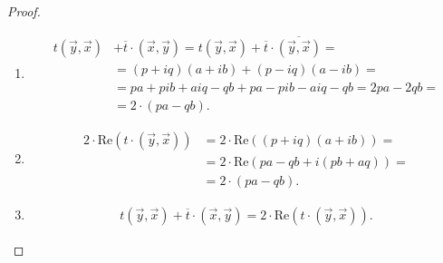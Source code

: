 \begin{proof}
    \begin{enumerate}
        \item \begin{align*}
            t(\vec{y}, \vec{x}) &+ \overline{t} \cdot (\vec{x}, \vec{y}) = t(\vec{y}, \vec{x}) + \overline{t} \cdot \overline{(\vec{y}, \vec{x})} = \\
            &= (p + iq)(a + ib) + (p - iq)(a - ib) = \\ 
            &= pa + pib + aiq - qb + pa - pib - aiq - qb = 2pa - 2qb = \\
            &= 2 \cdot (pa - qb).
        \end{align*}
        \item \begin{align*}
            2 \cdot \text{Re} (t \cdot (\vec{y}, \vec{x})) &= 2 \cdot \text{Re}((p + iq)(a + ib)) = \\
            &= 2 \cdot \text{Re}(pa - qb + i(pb + aq)) = \\
            &= 2 \cdot (pa - qb).
        \end{align*}
        \item \begin{align*}
            t(\vec{y}, \vec{x}) + \overline{t} \cdot (\vec{x}, \vec{y}) = 2 \cdot \text{Re} (t \cdot (\vec{y}, \vec{x})).
        \end{align*}
    \end{enumerate}
\end{proof}
